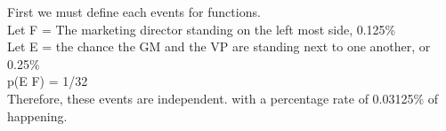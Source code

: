 \begin{enumerate}[label=(\alph*)]
  First we must define each events for functions. \\
  
  Let F = The marketing director standing on the left most side, 0.125\% \\
  
  Let E = the chance the GM and the VP are standing next to one another, or 0.25\% \\
  
  p(E \cap F) = 1/32 \\
  
  Therefore, these events are independent. with a percentage rate of 0.03125\% of happening. \\
  
\\\\
\end{enumerate}


